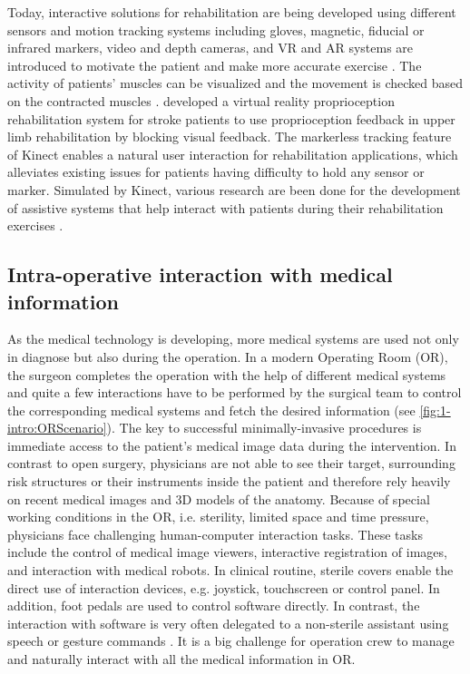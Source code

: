 Today, interactive solutions for rehabilitation are being developed using different sensors and motion tracking systems including gloves, magnetic, fiducial or infrared markers, video and depth cameras, and VR and AR systems are introduced to motivate the patient and make more accurate exercise \cite{DaGama2015,Cho2014}. 
The activity of patients' muscles can be visualized and the movement is checked based on the contracted muscles \cite{Woodford2007}. \citet{Cho2014} developed a virtual reality proprioception rehabilitation system for stroke patients to use proprioception feedback in upper limb rehabilitation by blocking visual feedback.
The markerless tracking feature of Kinect enables a natural user interaction for rehabilitation applications, which alleviates existing issues for patients having difficulty to hold any sensor or marker. Simulated by Kinect, various research are been done for the development of assistive systems that help interact with patients during their rehabilitation exercises \cite{Cordella2012, Gama2012a, Anton2013, Borghese2013}.

\subsection{Intra-operative interaction with medical information}
As the medical technology is developing, more medical systems are used not only in diagnose but also during the operation. In a modern Operating Room (OR), the surgeon completes the operation with the help of different medical systems and quite a few interactions have to be performed by the surgical team to control the corresponding medical systems and fetch the desired information (see \figurename{\ref{fig:1-intro:ORScenario}}).
The key to successful minimally-invasive procedures is immediate access to the patient's medical image data during the intervention. In contrast to open surgery, physicians are not able to see their target, surrounding risk structures or their instruments inside the patient and therefore rely heavily on recent medical images and 3D models of the anatomy. Because of special working conditions in the OR, i.e. sterility, limited space and time pressure, physicians face challenging human-computer interaction tasks. These tasks include the control of medical image viewers, interactive registration of images, and interaction with medical robots. In clinical routine, sterile covers enable the direct use of interaction devices, e.g. joystick, touchscreen or control panel. In addition, foot pedals are used to control software directly. In contrast, the interaction with software is very often delegated to a non-sterile assistant using speech or gesture commands \cite{Hubler2014}.
It is a big challenge for operation crew to manage and naturally interact with all the medical information in OR.

